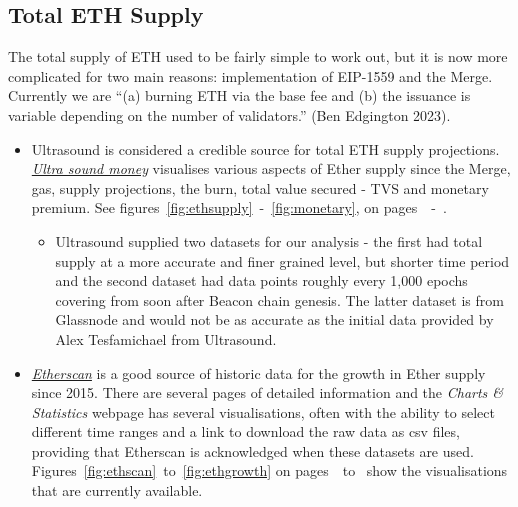 \documentclass[UTF8]{article}
\begin{document}
 \subsection{Total ETH Supply}
\label{sec:ethsupply} 
        The total supply of ETH used to be fairly simple to work out, but it is now more complicated for two main reasons:  implementation of EIP-1559 and the Merge.
Currently we are ``(a) burning ETH via the base fee and (b) the issuance is variable depending on the number of validators.'' (Ben Edgington 2023). 
\begin{itemize}
	\item Ultrasound is considered a credible source for total ETH supply projections. \\\textit{\href{https://ultrasound.money/}{Ultra sound money}} visualises various aspects of Ether supply since the Merge, gas, supply projections, the burn, total value secured - TVS and monetary premium. See figures~\ref{fig:ethsupply}~-~\ref{fig:monetary}, on pages~\pageref{fig:ethsupply}~-~\pageref{fig:monetary}.  

\begin{itemize}
	\item Ultrasound supplied two datasets for our analysis - the first had total supply at a more accurate and finer grained level, but shorter time period and the second dataset had data points roughly every 1,000 epochs covering from soon after Beacon chain genesis. The latter dataset is from Glassnode and would not be as accurate as the initial data provided by Alex Tesfamichael from Ultrasound.
\end{itemize}
	\item \textit{\href{https://etherscan.io/chart/ethersupplygrowth}{Etherscan}} is a good source of historic data for the growth in Ether supply since 2015. There are several pages of detailed information and the \textit{Charts \& Statistics} webpage has several visualisations, often with the ability to select different time ranges and a link to download the raw data as csv files, providing that Etherscan is acknowledged when these datasets are used.\\
	Figures~\ref{fig:ethscan}~to~\ref{fig:ethgrowth} on pages~\pageref{fig:ethscan}~to~\pageref{fig:ethgrowth} show the visualisations that are currently available.
\end{itemize}

\end{document}
